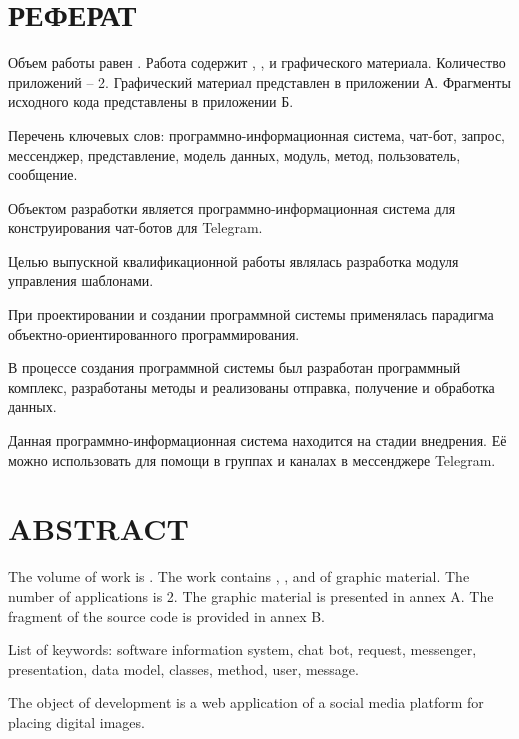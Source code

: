 \newsection
\section*{РЕФЕРАТ}

Объем работы равен . Работа содержит , ,  и  графического материала. Количество приложений – 2. Графический материал представлен в приложении А. Фрагменты исходного кода представлены в приложении Б.

	Перечень ключевых слов: программно-информационная система, чат-бот, запрос, мессенджер,
представление, модель данных, модуль, метод, пользователь, сообщение. 
	 
Объектом разработки является программно-информационная система для конструирования чат-ботов для Telegram.

Целью выпускной квалификационной работы являлась разработка модуля управления шаблонами.

При проектировании и создании программной системы применялась парадигма объектно-ориентированного программирования.

	В процессе создания программной системы был разработан программный комплекс, разработаны методы и реализованы отправка, получение и обработка данных.
	
Данная программно-информационная система находится на стадии внедрения. Её можно использовать для помощи в группах и каналах в мессенджере Telegram.
\newpage
{}
\section*{ABSTRACT}
  
The volume of work is . The work contains , ,  and  of graphic material. The number of applications is 2. The graphic material is presented in annex A. The fragment of the source code is provided in annex B.

List of keywords: software information system, chat bot, request, messenger, presentation, data model, classes, method, user, message. 

The object of development is a web application of a social media platform for placing digital images.

